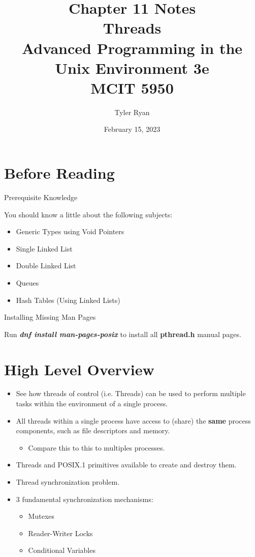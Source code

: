 \documentclass{article}
\author{Tyler Ryan}
\date{February 15, 2023}
\title{Chapter 11 Notes \\

\textbf{Threads}\\
Advanced Programming in the Unix Environment 3e\\
MCIT 5950}
\begin{document}

\maketitle
\tableofcontents
\clearpage

\section{Before Reading}
{\Large Prerequisite Knowledge}

You should know a little about the following subjects:
\begin{itemize}
    \item Generic Types using Void Pointers
    \item Single Linked List
    \item Double Linked List
    \item Queues
    \item Hash Tables (Using Linked Lists)\newline
\end{itemize}

{\Large Installing Missing Man Pages}

Run \textbf{\emph{dnf install man-pages-posix}} to install all \textbf{pthread.h} manual pages. \newline

\section{High Level Overview}
\begin{itemize}    
    \item See how threads of control (i.e. Threads) can be used to perform multiple tasks within the environment of a single process.
    \item All threads within a single process have access to (share) the \textbf{same} process components, such as file descriptors and memory.
        \begin{itemize}
            \item Compare this to this to multiples processes.
        \end{itemize}
    \item Threads and POSIX.1 primitives available to create and destroy them.
    \item Thread synchronization problem.\newline
    \item 3 fundamental synchronization mechanisms:
    \begin{itemize}
        \item Mutexes
        \item Reader-Writer Locks
        \item Conditional Variables
    \end{itemize}
\end{itemize}
\end{document}
